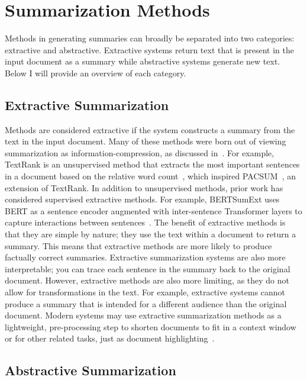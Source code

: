 \section{Summarization Methods}\label{sec:background-methods}

Methods in generating summaries can broadly be separated into two categories: extractive and abstractive. Extractive systems return text that is present in the input document as a summary while abstractive systems generate new text. Below I will provide an overview of each category.

\subsection{Extractive Summarization}

Methods are considered extractive if the system constructs a summary from the text in the input document. Many of these methods were born out of viewing summarization as information-compression, as discussed in~. For example, TextRank is an unsupervised method that extracts the most important sentences in a document based on the relative word count~\cite{Mihalcea2004TextRankBO}, which inspired PACSUM~\cite{Jie2023UnsupervisedES}, an extension of TextRank. In addition to unsupervised methods, prior work has considered supervised extractive methods. For example, BERTSumExt uses BERT as a sentence encoder augmented with inter-sentence Transformer layers to capture interactions between sentences~\cite{Liu2019TextSW}. The benefit of extractive methods is that they are simple by nature; they use the text within a document to return a summary. This means that extractive methods are more likely to produce factually correct summaries. Extractive summarization systems are also more interpretable; you can trace each sentence in the summary back to the original document. However, extractive methods are also more limiting, as they do not allow for transformations in the text. For example, extractive systems cannot produce a summary that is intended for a different audience than the original document. Modern systems may use extractive summarization methods as a lightweight, pre-processing step to shorten documents to fit in a context window~\cite{xu2020coarse, liu2023lost} or for other related tasks, just as document highlighting~\cite{Fok2023ScimIS}.

\subsection{Abstractive Summarization}

